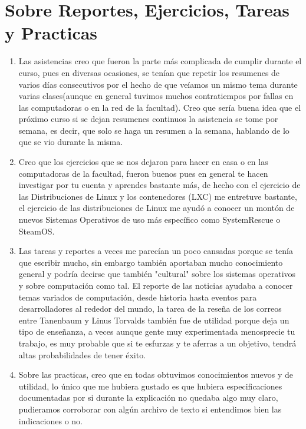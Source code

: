 \documentclass[a4paper, 11pt, oneside]{article}
\begin{document}
\section*{Sobre Reportes, Ejercicios, Tareas y Practicas}
\begin{enumerate}
    \item Las asistencias creo que fueron la parte más complicada de cumplir durante el curso, pues en diversas ocasiones, se tenían que repetir los resumenes de varios días consecutivos por el hecho de que veíamos un mismo tema durante varias clases(aunque en general tuvimos muchos contratiempos por fallas en las computadoras o en la red de la facultad). Creo que sería buena idea que el próximo curso si se dejan resumenes continuos la asistencia se tome por semana, es decir, que solo se haga un resumen a la semana, hablando de lo que se vio durante la misma.
    \item Creo que los ejercicios que se nos dejaron para hacer en casa o en las computadoras de la facultad, fueron buenos pues en general te hacen investigar por tu cuenta y aprendes bastante más, de hecho con el ejercicio de las Distribuciones de Linux y los contenedores (LXC) me entretuve bastante, el ejercicio de las distribuciones de Linux me ayudó a conocer un montón de nuevos Sistemas Operativos de uso más específico como SystemRescue o SteamOS.
    \item Las tareas y reportes a veces me parecían un poco cansadas porque se tenía que escribir mucho, sin embargo también aportaban mucho conocimiento general y podría decirse que también "cultural" sobre los sistemas operativos y sobre computación como tal. El reporte de las noticias ayudaba a conocer temas variados de computación, desde historia hasta eventos para desarrolladores al rededor del mundo, la tarea de la reseña de los correos entre Tanenbaum y Linus Torvalds también fue de utilidad porque deja un tipo de enseñanza, a veces aunque gente muy experimentada menosprecie tu trabajo, es muy probable que si te esfurzas y te aferras a un objetivo, tendrá altas probabilidades de tener éxito.
    \item Sobre las practicas, creo que en todas obtuvimos conocimientos nuevos y de utilidad, lo único que me hubiera gustado es que hubiera especificaciones documentadas por si durante la explicación no quedaba algo muy claro, pudieramos corroborar con algún archivo de texto si entendimos bien las indicaciones o no.
\end{enumerate}
\end{document}
